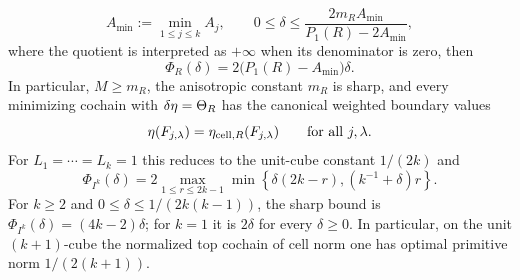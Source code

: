 \begin{theorem}
\[
A_{\min}:=\min_{1\le j\le k}A_j,
\qquad
0\le\delta\le
\frac{2m_RA_{\min}}{P_1(R)-2A_{\min}},
\]
where the quotient is interpreted as $+\infty$ when its denominator is zero,
then
\begin{equation}
\label{eq:cubical-small-deficit-profile}
\Phi_R(\delta)=2\bigl(P_1(R)-A_{\min}\bigr)\delta.
\end{equation}
In particular, $M\ge m_R$, the anisotropic constant $m_R$ is sharp, and every
minimizing cochain with $\delta\eta=\Theta_R$ has the canonical weighted boundary
values
\[
\eta(F_{j,\lambda})=\eta_{\mathrm{cell},R}(F_{j,\lambda})
\qquad
\text{for all }j,\lambda.
\]
For $L_1=\cdots=L_k=1$ this reduces to the unit-cube constant $1/(2k)$ and
\begin{equation}
\label{eq:cubical-unit-profile}
\Phi_{I^k}(\delta)
=2\max_{1\le r\le 2k-1}
\min\left\{\delta(2k-r),(k^{-1}+\delta)r\right\}.
\end{equation}
For $k\ge2$ and $0\le\delta\le1/(2k(k-1))$, the sharp bound is
$\Phi_{I^k}(\delta)=(4k-2)\delta$; for $k=1$ it is $2\delta$ for every
$\delta\ge0$. In particular, on the unit $(k+1)$-cube the normalized
top cochain of cell norm one has optimal primitive norm $1/(2(k+1))$.
\end{theorem}


